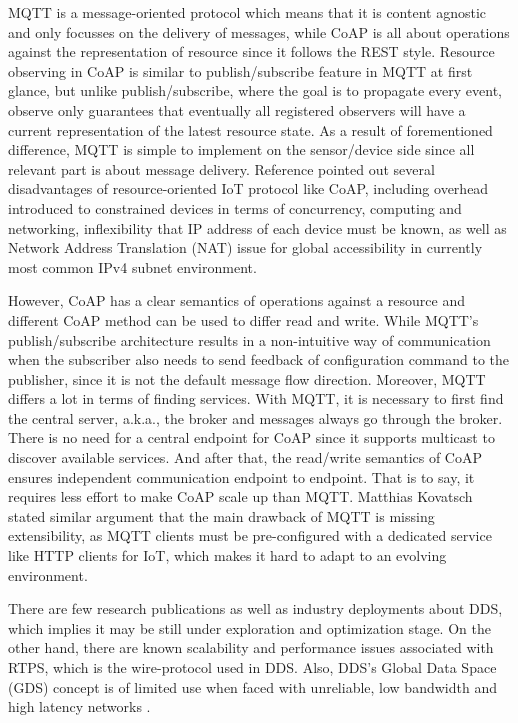 MQTT is a message-oriented protocol which means that it is content agnostic and only focusses on the delivery of messages, while CoAP is all about operations against the representation of resource since it follows the REST style. Resource observing in CoAP is similar to publish/subscribe feature in MQTT at first glance, but unlike publish/subscribe, where the goal is to propagate every event, observe only guarantees that eventually all registered observers will have a current representation of the latest resource state. As a result of forementioned difference, MQTT is simple to implement on the sensor/device side since all relevant part is about message delivery. Reference \cite{6918928} pointed out several disadvantages of resource-oriented IoT protocol like CoAP, including overhead introduced to constrained devices in terms of concurrency, computing and networking, inflexibility that IP address of each device must be known, as well as Network Address Translation (NAT) issue for global accessibility in currently most common IPv4 subnet environment. 

However, CoAP has a clear semantics of operations against a resource and different CoAP method can be used to differ read and write. While MQTT's publish/subscribe architecture results in a non-intuitive way of communication when the subscriber also needs to send feedback of configuration command to the publisher, since it is not the default message flow direction. Moreover, MQTT differs a lot in terms of finding services. With MQTT, it is necessary to first find the central server, a.k.a., the broker and messages always go through the broker. There is no need for a central endpoint for CoAP since it supports multicast to discover available services. And after that, the read/write semantics of CoAP ensures independent communication endpoint to endpoint. That is to say, it requires less effort to make CoAP scale up than MQTT. Matthias Kovatsch \cite{kovatsch2015scalable} stated similar argument that the main drawback of MQTT is missing extensibility, as MQTT clients must be pre-configured with a dedicated service like HTTP clients for IoT, which makes it hard to adapt to an evolving environment.

There are few research publications as well as industry deployments about DDS, which implies it may be still under exploration and optimization stage. On the other hand, there are known scalability \cite{esposito2011data} and performance \cite{sanchez2011bloom} issues associated with RTPS, which is the wire-protocol used in DDS. Also, DDS's Global Data Space (GDS) concept is of limited use when faced with unreliable, low bandwidth and high latency networks \cite{7396558}.

